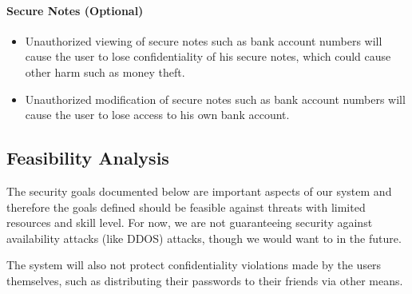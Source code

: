 \documentclass{article}
\begin{document}
\paragraph{Secure Notes (Optional)}
\label{par:secure_notes_optional_}
\begin{itemize}
  \item Unauthorized viewing of secure notes such as bank account numbers will cause the user to lose confidentiality of his secure notes, which could cause other harm such as money theft.
  \item Unauthorized modification of secure notes such as bank account numbers will cause the user to lose access to his own bank account.
\end{itemize}

\subsection{Feasibility Analysis}
\label{sub:feasibility_analysis}
\par The security goals documented below are important aspects of our system and therefore the goals defined should be feasible against threats with limited resources and skill level. For now, we are not guaranteeing security against availability attacks (like DDOS) attacks, though we would want to in the future.
\par The system will also not protect  confidentiality violations made by the users themselves, such as distributing their passwords to their friends via other means.
\end{document}

